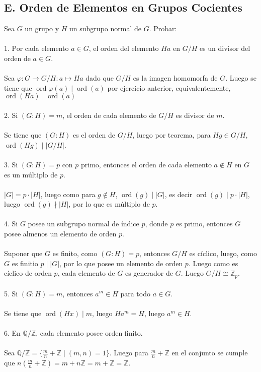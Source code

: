 \documentclass{article}
\newcommand{\Z}{\mathbb{Z}}
\begin{document}
\subsection*{E. Orden de Elementos en Grupos Cocientes}
Sea $G$ un grupo y $H$ un subgrupo normal de $G$. Probar:
\\
\\
1. Por cada elemento $a \in G$, el orden del elemento $Ha$ en $G/H$ es un divisor del orden de $a \in G$.
\\
\\
Sea $\varphi:G \to G/H: a \mapsto Ha$ dado que $G/H$ es la imagen homomorfa de $G$. Luego se tiene que $\operatorname{ord}\varphi(a)\mid \operatorname{ord}{(a)}$ por ejercicio anterior, equivalentemente, $\operatorname{ord}(Ha) \mid \operatorname{ord}(a)$
\\
\\
2. Si $(G:H)=m$, el orden de cada elemento de $G/H$ es divisor de $m$.
\\
\\
Se tiene que $(G:H)$ es el orden de $G/H$, luego por teorema, para $Hg \in G/H$, $\operatorname{ord}(Hg) \mid |G/H|$.
\\
\\
3. Si $(G:H)=p$ con $p$ primo, entonces el orden de cada elemento $a \notin H$ en $G$ es un múltiplo de $p$.
\\
\\
$|G|=p\cdot |H|$, luego como para $g \notin H$, $\operatorname{ord}(g) \mid |G|$, es decir $\operatorname{ord}(g)\mid p \cdot |H|$, luego $\operatorname{ord}(g) \nmid |H|$, por lo que es múltiplo de $p$.
\\
\\
4. Si $G$ posee un subgrupo normal de índice $p$, donde $p$ es primo, entonces $G$ posee almenos un elemento de orden $p$.
\\
\\
Suponer que $G$ es finito, como $(G:H)=p$, entonces $G/H$ es cíclico, luego, como $G$ es finitio $p\mid |G|$, por lo que posee un elemento de orden $p$. Luego como es cíclico de orden $p$, cada elemento de $G$ es generador de $G$. Luego $G/H \cong \Z_{p}$.
\\
\\
5. Si $(G:H)=m$, entonces $a^{m} \in H$ para todo $a \in G$.
\\
\\
Se tiene que $\operatorname{ord}(Hx) \mid m$, luego $Ha^{m}=H$, luego $a^{m} \in H$.
\\
\\
6. En $\mathbb{Q}/\Z$, cada elemento posee orden finito.
\\
\\
Sea $\mathbb{Q}/\Z=\{\frac{m}{n} + \Z \mid (m,n)=1 \}$. Luego para $\frac{m}{n} + \Z$ en el conjunto se cumple que $n(\frac{m}{n} + \Z)=m+n\Z=m+\Z=\Z$.
\end{document}
